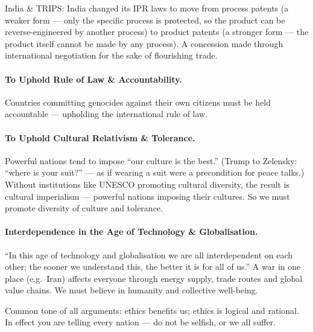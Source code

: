 \begin{ExampleBox}
India \& TRIPS: India changed its IPR laws to move from process patents (a weaker form --- only the specific process is protected, so the product can be reverse-engineered by another process) to product patents (a stronger form --- the product itself cannot be made by any process). A concession made through international negotiation for the sake of flourishing trade.
\end{ExampleBox}

\paragraph{To Uphold Rule of Law \& Accountability.} Countries committing genocides against their own citizens must be held accountable --- upholding the international rule of law.

\paragraph{To Uphold Cultural Relativism \& Tolerance.}
\begin{KeyConcept}
Powerful nations tend to impose ``our culture is the best.'' (Trump to Zelensky: ``where is your suit?'' --- as if wearing a suit were a precondition for peace talks.) Without institutions like UNESCO promoting cultural diversity, the result is cultural imperialism --- powerful nations imposing their cultures. So we must promote diversity of culture and tolerance.
\end{KeyConcept}

\paragraph{Interdependence in the Age of Technology \& Globalisation.}
\begin{KeyConcept}
``In this age of technology and globalisation we are all interdependent on each other; the sooner we understand this, the better it is for all of us.'' A war in one place (e.g.\ Iran) affects everyone through energy supply, trade routes and global value chains. We must believe in humanity and collective well-being.
\end{KeyConcept}

\begin{CriticalPoint}
Common tone of all arguments: ethics benefits us; ethics is logical and rational. In effect you are telling every nation --- do not be selfish, or we all suffer.
\end{CriticalPoint}

